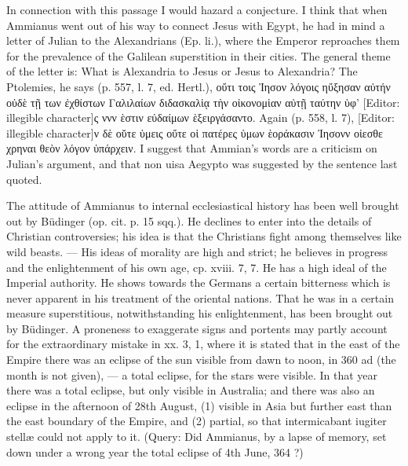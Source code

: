 In connection with this passage I would hazard a conjecture. I think that when Ammianus went out of his way to connect Jesus with Egypt, he had in mind a letter of Julian to the Alexandrians (Ep. li.), where the Emperor reproaches them for the prevalence of the Galilean superstition in their cities. The general theme of the letter is: What is Alexandria to Jesus or Jesus to Alexandria? The Ptolemies, he says (p. 557, l. 7, ed. Hertl.), \textgreek{ο\texthebrew{ὔ}τι τοις \texthebrew{Ἰ}ησον λόγοις η\texthebrew{ὔ}ξησαν α\texthebrew{ὐ}τήν ο\texthebrew{ὐ}δ\texthebrew{ὲ} τ\texthebrew{ῇ} των \texthebrew{ἐ}χθίστων Γαλιλαίων διδασκαλ\texthebrew{ἱᾳ} τ\texthebrew{ὴ}ν ο\texthebrew{ἰ}κονομ\texthebrew{ἱ}αν α\texthebrew{ὐ}τ\texthebrew{ῇ} ταύτην \texthebrew{ὑ}φ}\texthebrew{}’ [Editor: illegible character]\textgreek{ς ννν \texthebrew{ὲ}στιν ε\texthebrew{ὐ}δαίμων \texthebrew{ὲ}ξειργάσαντο}. Again (p. 558, l. 7), [Editor: illegible character]\textgreek{ν δ\texthebrew{ὲ} ο\texthebrew{ῠ}τε \texthebrew{ὑ}μεις ο\texthebrew{ὔ}τε ο\texthebrew{ἱ} πατέρες \texthebrew{ὑ}μων \texthebrew{ὲ}οράκασιν \texthebrew{Ἰ}ησονν ο\texthebrew{ἰ}εσθε χρηναι θε\texthebrew{ὸ}ν λόγον \texthebrew{ὑ}πάρχειν}. I suggest that Ammian\texthebrew{}’s words are a criticism on Julian\texthebrew{}’s argument, and that non uisa Aegypto was suggested by the sentence last quoted.

The attitude of Ammianus to internal ecclesiastical history has been well brought out by Büdinger (op. cit. p. 15 sqq.). He declines to enter into the details of Christian controversies; his idea is that the Christians fight among themselves like wild beasts. \texthebrew{—} His ideas of morality are high and strict; he believes in progress and the enlightenment of his own age, cp. xviii. 7, 7. He has a high ideal of the Imperial authority. He shows towards the Germans a certain bitterness which is never apparent in his treatment of the oriental nations. That he was in a certain measure superstitious, notwithstanding his enlightenment, has been brought out by Büdinger. A proneness to exaggerate signs and portents may partly account for the extraordinary mistake in xx. 3, 1, where it is stated that in the east of the Empire there was an eclipse of the sun visible from dawn to noon, in 360 ad (the month is not given), \texthebrew{—} a total eclipse, for the stars were visible. In that year there was a total eclipse, but only visible in Australia; and there was also an eclipse in the afternoon of 28th August, (1) visible in Asia but further east than the east boundary of the Empire, and (2) partial, so that intermicabant iugiter stellæ could not apply to it. (Query: Did Ammianus, by a lapse of memory, set down under a wrong year the total eclipse of 4th June, 364 ?)

